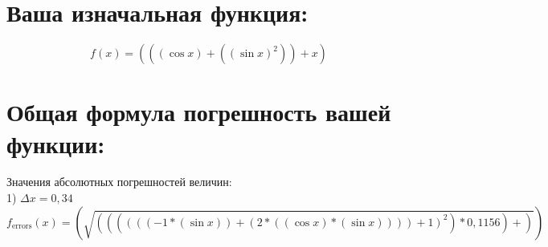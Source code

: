 \documentclass[12pt,a4paper]{scrartcl}
\DeclareMathOperator{\errors}{errors}
\begin{document}
\section{Ваша изначальная функция:} 
 \begin{equation} f(x) = {({({(\cos{x})}+{({(\sin{x})}^{2})})}+{x})}\end{equation}
\section{Общая формула погрешность вашей функции:} 
Значения абсолютных погрешностей величин: \\
	1) {${\Delta x = 0,34}$} \\
\begin{equation} f_{\errors}(x) = {(\sqrt{({({({({({({-1}*{(\sin{x})})}+{({2}*{({(\cos{x})}*{(\sin{x})})})})}+{1})}^{2})}*{0,1156})}+)})}\end{equation}
\end{document}

